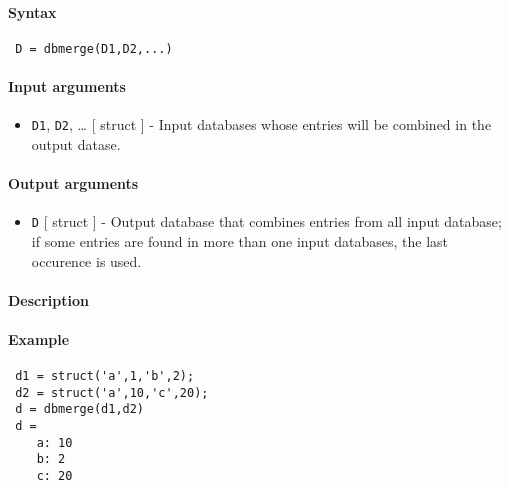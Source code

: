 


	\paragraph{Syntax}
 
 \begin{verbatim}
 D = dbmerge(D1,D2,...)
 \end{verbatim}
 
 \paragraph{Input arguments}
 
 \begin{itemize}
 \item
   \texttt{D1}, \texttt{D2}, \ldots{} {[} struct {]} - Input databases
   whose entries will be combined in the output datase.
 \end{itemize}
 
 \paragraph{Output arguments}
 
 \begin{itemize}
 \item
   \texttt{D} {[} struct {]} - Output database that combines entries from
   all input database; if some entries are found in more than one input
   databases, the last occurence is used.
 \end{itemize}
 
 \paragraph{Description}
 
 \paragraph{Example}
 
 \begin{verbatim}
 d1 = struct('a',1,'b',2);
 d2 = struct('a',10,'c',20);
 d = dbmerge(d1,d2)
 d =
    a: 10
    b: 2
    c: 20
 \end{verbatim}


